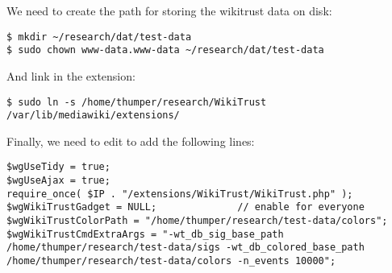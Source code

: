We need to create the path for storing the wikitrust data on disk:
\begin{verbatim}
$ mkdir ~/research/dat/test-data
$ sudo chown www-data.www-data ~/research/dat/test-data
\end{verbatim}
And link in the extension:
\begin{verbatim}
$ sudo ln -s /home/thumper/research/WikiTrust /var/lib/mediawiki/extensions/
\end{verbatim}

Finally, we need to edit  to add the following lines:
\begin{verbatim}
$wgUseTidy = true;
$wgUseAjax = true;
require_once( $IP . "/extensions/WikiTrust/WikiTrust.php" );
$wgWikiTrustGadget = NULL;              // enable for everyone
$wgWikiTrustColorPath = "/home/thumper/research/test-data/colors";
$wgWikiTrustCmdExtraArgs = "-wt_db_sig_base_path /home/thumper/research/test-data/sigs -wt_db_colored_base_path /home/thumper/research/test-data/colors -n_events 10000";
\end{verbatim}

